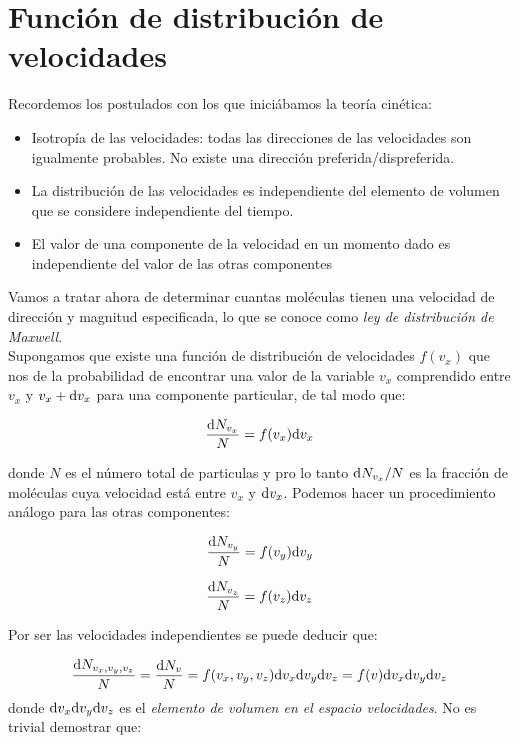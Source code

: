 \documentclass[12pt,a4paper,oneside]{book}
\begin{document}
\section{Función de distribución de velocidades}

Recordemos los postulados con los que iniciábamos la teoría cinética:

\begin{itemize}
\item Isotropía de las velocidades: todas las direcciones de las velocidades son igualmente probables. No existe una dirección preferida/dispreferida.
\item La distribución de las velocidades es independiente del elemento de volumen que se considere independiente del tiempo.
\item El valor de una componente de la velocidad en un momento dado es independiente del valor de las otras componentes
\end{itemize}

Vamos a tratar ahora de determinar cuantas moléculas tienen una velocidad de dirección y magnitud especificada, lo que se conoce como \textit{ley de distribución de Maxwell}. \\


Supongamos que existe una función de distribución de velocidades $f(v_x)$ que nos de la probabilidad de encontrar una valor de la variable $v_x$ comprendido entre $v_x$ y $v_x + \mathrm{d} v_x$ para una componente particular, de tal modo que: 

\begin{equation}
\dfrac{\mathrm{d} N_{v_x}}{N} = f(v_x) \mathrm{d} v_x \label{ec:7.1-001}
\end{equation}

donde $N$ es el número total de particulas y pro lo tanto $\mathrm{d} N_{v_x} / N$ es la fracción de moléculas cuya velocidad está entre $v_x$ y $\mathrm{d} v_x$. Podemos hacer un procedimiento análogo para las otras componentes:

\begin{equation}
\dfrac{\mathrm{d} N_{v_y}}{N} = f(v_y) \mathrm{d} v_y
\end{equation}

\begin{equation}
\dfrac{\mathrm{d} N_{v_z}}{N} = f(v_z) \mathrm{d} v_z
\end{equation}

Por ser las velocidades independientes se puede deducir que:

\begin{equation}
\dfrac{\mathrm{d} N_{v_x, v_y, v_z}}{N} = \dfrac{\mathrm{d} N_v}{N} = f(v_x, v_y, v_z) \mathrm{d} v_x  \mathrm{d} v_y \mathrm{d} v_z = f(v)  \mathrm{d} v_x \mathrm{d} v_y \mathrm{d} v_z
\end{equation}
donde $  \mathrm{d} v_x \mathrm{d} v_y \mathrm{d} v_z$ es el \textit{elemento de volumen en el espacio velocidades}. No es trivial demostrar que:
\end{document}
